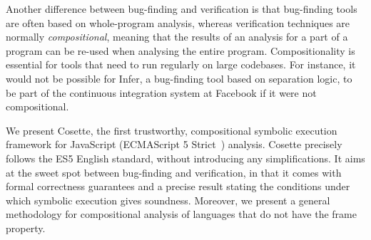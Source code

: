 \documentclass[acmsmall,review,anonymous]{acmart}\settopmatter{printfolios=true,printccs=false,printacmref=false}
\newcommand{\jsil}{JSIL\xspace}
\newcommand{\cosette}{Cosette\xspace}
\begin{document}
Another difference between bug-finding and verification is that bug-finding tools are often based on whole-program analysis, whereas verification techniques are normally \emph{compositional}, meaning that the results of an analysis for a part of a program can be re-used when analysing the entire program. Compositionality is essential for tools that need to run regularly on large codebases. For instance, it would not be possible for Infer, a bug-finding tool based on separation logic, to be part of the continuous integration system at Facebook if it were not compositional.

We present \cosette, the first trustworthy, compositional symbolic execution framework for JavaScript (ECMAScript 5 Strict~\cite{ecma}) analysis. \cosette precisely follows the ES5 English standard, without introducing any simplifications. 
It aims at the sweet spot between bug-finding and verification, 
in that it comes with formal correctness guarantees and a precise result stating the conditions under which symbolic execution gives soundness. Moreover, we present a general methodology for compositional analysis of languages that do not have the frame property.






\end{document}
